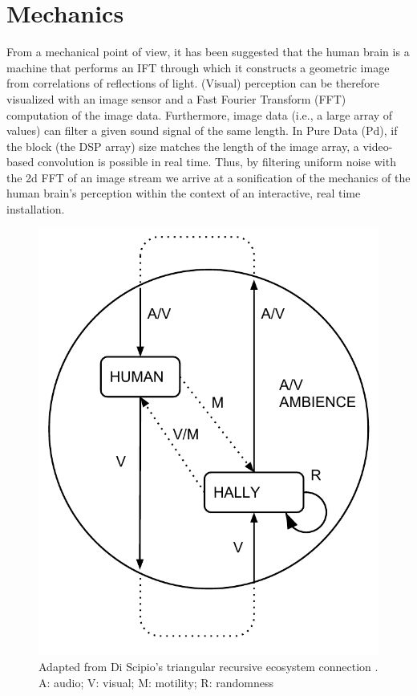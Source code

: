 \documentclass{nime-alternate}
\begin{document}
\section{Mechanics}
From a mechanical point of view, it has been suggested that the human brain is a machine that performs an IFT through which it constructs a geometric image from correlations of reflections of light.\cite{connes:shapes} (Visual) perception can be therefore visualized with an image sensor and a Fast Fourier Transform (FFT) computation of the image data.\cite{camara:pixfft2} Furthermore, image data (i.e., a large array of values) can filter a given sound signal of the same length. In Pure Data\cite{puckette:puredata} (Pd), if the block (the DSP array) size matches the length of the image array, a video-based convolution is possible in real time. Thus, by filtering uniform noise with the 2d FFT of an image stream we arrive at a sonification of the mechanics of the human brain's perception within the context of an interactive, real time installation. 


\begin{figure}[htbp]
    \centering
        \includegraphics[width=1\columnwidth]{hally-human-1}
    \caption{Adapted from Di Scipio's triangular recursive ecosystem connection \cite{discipio:interface}. A: audio; V: visual; M: motility; R: randomness}
    \label{fig:hally-human-1}
\end{figure}
\end{document}
